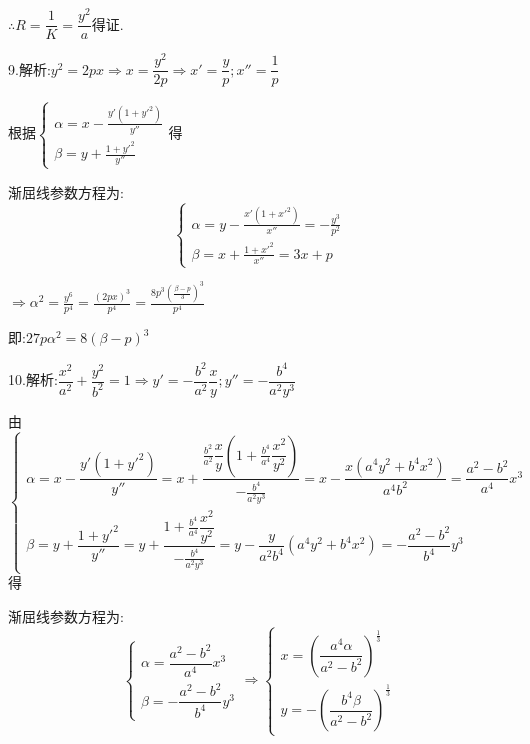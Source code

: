 $\therefore R = \dfrac{1}{K} = \dfrac{{{y^2}}}{a}$得证.

9.解析:${y^2} = 2px \Rightarrow x = \dfrac{{{y^2}}}{{2p}} \Rightarrow x' = \dfrac{y}{p};x'' = \dfrac{1}{p}$

根据$\left\{ \begin{array}{l}
\alpha  = x - \frac{{y'(1 + {{y'}^2})}}{{y''}}\\
\beta  = y + \frac{{1 + {{y'}^2}}}{{y''}}
\end{array} \right.$得

渐屈线参数方程为:\[\left\{ \begin{array}{l}
\alpha  = y - \frac{{x'(1 + {{x'}^2})}}{{x''}} =  - \frac{{{y^3}}}{{{p^2}}}\\
\beta  = x + \frac{{1 + {{x'}^2}}}{{x''}} = 3x + p
\end{array} \right.\]

$ \Rightarrow {\alpha ^2} = \frac{{{y^6}}}{{{p^4}}} = \frac{{{{(2px)}^3}}}{{{p^4}}} = \frac{{8{p^3}{{(\frac{{\beta  - p}}{3})}^3}}}{{{p^4}}}$

即:$27p{\alpha ^2} = 8{(\beta  - p)^3}$

10.解析:$\dfrac{{{x^2}}}{{{a^2}}} + \dfrac{{{y^2}}}{{{b^2}}} = 1 \Rightarrow y' =  - \dfrac{{{b^2}}}{{{a^2}}}\dfrac{x}{y};y'' =  - \dfrac{{{b^4}}}{{{a^2}{y^3}}}$

由$\left\{ \begin{array}{l}
\alpha  = x - \dfrac{{y'(1 + {{y'}^2})}}{{y''}} = x + \dfrac{{\frac{{{b^2}}}{{{a^2}}}\dfrac{x}{y}(1 + \frac{{{b^4}}}{{{a^4}}}\dfrac{{{x^2}}}{{{y^2}}})}}{{ - \frac{{{b^4}}}{{{a^2}{y^3}}}}} = x - \dfrac{{x({a^4}{y^2} + {b^4}{x^2})}}{{{a^4}{b^2}}} = \dfrac{{{a^2} - {b^2}}}{{{a^4}}}{x^3}\\
\beta  = y + \dfrac{{1 + {{y'}^2}}}{{y''}} = y + \dfrac{{1 + \frac{{{b^4}}}{{{a^4}}}\dfrac{{{x^2}}}{{{y^2}}}}}{{ - \frac{{{b^4}}}{{{a^2}{y^3}}}}} = y - \dfrac{y}{{{a^2}{b^4}}}({a^4}y{}^2 + {b^4}{x^2}) =  - \dfrac{{{a^2} - {b^2}}}{{{b^4}}}{y^3}
\end{array} \right.$得

渐屈线参数方程为:\[\left\{ \begin{array}{l}
\alpha  = \dfrac{{{a^2} - {b^2}}}{{{a^4}}}{x^3}\\
\beta  =  - \dfrac{{{a^2} - {b^2}}}{{{b^4}}}{y^3}
\end{array} \right. \Rightarrow \left\{ \begin{array}{l}
x = {(\dfrac{{{a^4}\alpha }}{{{a^2} - {b^2}}})^{\frac{1}{3}}}\\
y =  - {(\dfrac{{{b^4}\beta }}{{{a^2} - {b^2}}})^{\frac{1}{3}}}
\end{array} \right.\]

